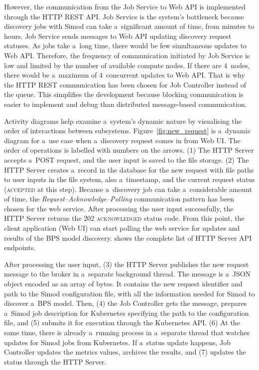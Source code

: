 \documentclass[12pt]{article}
\begin{document}
However, the communication from the Job Service to Web API is implemented through the HTTP REST API. Job Service is the system's bottleneck because discovery jobs with Simod can take a~significant amount of time, from minutes to hours. Job Service sends messages to Web API updating discovery request statuses. As jobs take a~long time, there would be few simultaneous updates to Web API. Therefore, the frequency of communication initiated by Job Service is low and limited by the number of available compute nodes. If there are 4~nodes, there would be a~maximum of 4~concurrent updates to Web API. That is why the HTTP REST communication has been chosen for Job Controller instead of the queue. This simplifies the development because blocking communication is easier to implement and debug than distributed message-based communication.

Activity diagrams help examine a~system's dynamic nature by visualising the order of interactions between subsystems. Figure~\ref{fig:new_request} is a~dynamic diagram for a~use case when a~discovery request comes in from Web UI. The order of operations is labelled with numbers on the arrows. (1) The HTTP Server accepts a~POST request, and the user input is saved to the file storage. (2) The HTTP Server creates a~record in the database for the new request with file paths to user inputs in the file system, also a~timestamp, and the current request status (\textsc{accepted} at this step). Because a~discovery job can take a~considerable amount of time, the \emph{Request--Acknowledge--Polling} communication pattern has been chosen for the web service. After processing the user input successfully, the HTTP Server returns the \textsc{202 acknowledged} status code. From this point, the client application (Web UI) can start polling the web service for updates and results of the BPS model discovery.  shows the complete list of HTTP Server API endpoints.

After processing the user input, (3) the HTTP Server publishes the new request message to the broker in a~separate background thread. The message is a~JSON object encoded as an array of bytes. It contains the new request identifier and path to the Simod configuration file, with all the information needed for Simod to discover a~BPS model. Then, (4) the Job Controller gets the message, prepares a~Simod job description for Kubernetes specifying the path to the configuration file, and (5) submits it for execution through the Kubernetes API. (6) At the same time, there is already a~running process in a~separate thread that watches updates for Simod jobs from Kubernetes. If a~status update happens, Job Controller updates the metrics values, archives the results, and (7) updates the status through the HTTP Server.
\end{document}
